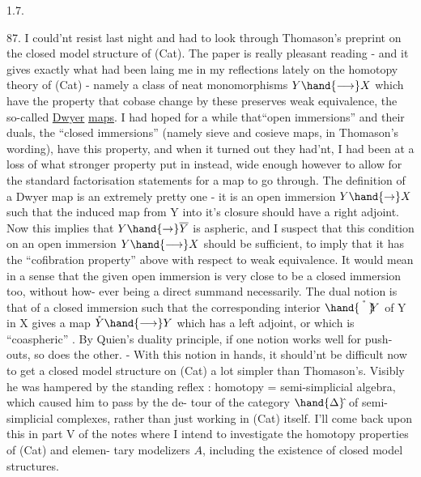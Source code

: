 
1.7.

87.    I could'nt resist last night and had to look through Thomason's
preprint on the closed model structure of (Cat).  The paper is  really
pleasant reading  -  and it gives exactly what had been laing me in my
reflections lately on the homotopy theory of (Cat)  -  namely a class of
neat monomorphisms  $Y\hand{\longrightarrow}X$  which  have the property that cobase change
by these preserves weak equivalence,  the so-called \uline{Dwyer} \uline{maps}.  I had
hoped for a while that``open immersions''  and their duals,  the ``closed
immersions''  (namely sieve and cosieve maps,  in Thomason's wording), have
this property,  and when it turned out they had'nt,  I had been at a loss
of what stronger property put in instead,  wide enough however to allow
for the standard factorisation statements for a map to go through.  The
definition of a Dwyer map is an extremely pretty one  -  it is an open
immersion $Y\hand{\to}X$  such that the induced map from Y into it's closure 
should have a right adjoint.  Now this implies that $Y\hand{\to}\overline{Y}$  is aspheric,
and I suspect that this  condition on an open immersion $Y\hand{\longrightarrow}X$ should be
sufficient,  to imply that it has the ``cofibration property'' above with
respect to weak equivalence.  It would mean in a sense that the given
open immersion is very close to be a closed immersion too,  without how-%
ever being a direct summand necessarily.  The dual notion  is that of a
closed immersion such that the corresponding interior  $\hand{\mathring{\phantom{Y}}}\!\!Y$  of Y in X gives
a map  $\mathring{Y}\hand{\longrightarrow}Y$  which has a left adjoint,  or  which is ``coaspheric'' .
By  Quien's duality principle,  if one notion works well for push-%
outs,  so does the other.  -  With this notion in hands,  it should'nt
be difficult now to get a closed model structure on (Cat) a lot simpler
than Thomason's.  Visibly he was hampered by the standing reflex :
homotopy = semi-simplicial algebra,  which caused him to pass by the de-%
tour of the category $\hand{\Delta}\hat{}$ of semi-simplicial complexes,  rather than just
working in (Cat) itself.  I'll  come back upon this in part V  of the notes\hand{,}
where I intend to investigate the homotopy properties of (Cat) and elemen-%
tary modelizers $A\hat{}$,  including the existence of closed model structures.

